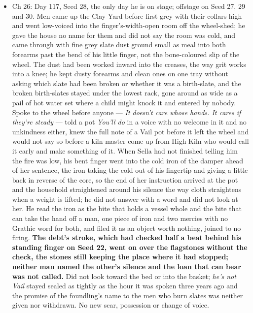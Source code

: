 \documentclass{design/chronicle}
\begin{document}
{\begin{itemize}[leftmargin=1.4em,itemsep=1pt,topsep=3pt,parsep=0pt]
\item Ch 26: Day 117, Seed 28, the only day he is on stage; offstage on Seed 27, 29 and 30. Men came up the Clay Yard before first grey with their collars high and went low-voiced into the finger’s-width-open room off the wheel-shed; he gave the house no name for them and did not say the room was cold, and came through with fine grey slate dust ground small as meal into both forearms past the bend of his little finger, not the bone-coloured slip of the wheel. The dust had been worked inward into the creases, the way grit works into a knee; he kept dusty forearms and clean ones on one tray without asking which slate had been broken or whether it was a birth-slate, and the broken birth-slates stayed under the lowest rack, gone around as wide as a pail of hot water set where a child might knock it and entered by nobody. Spoke to the wheel before anyone — \emph{It doesn’t care whose hands. It cares if they’re steady} — told a pot \emph{You’ll do} in a voice with no welcome in it and no unkindness either, knew the full note of a Vail pot before it left the wheel and would not say so before a kiln-master come up from High Kiln who would call it early and make something of it. When Sella had not finished telling him the fire was low, his bent finger went into the cold iron of the damper ahead of her sentence, the iron taking the cold out of his fingertip and giving a little back in reverse of the core, so the end of her instruction arrived at the pot and the household straightened around his silence the way cloth straightens when a weight is lifted; he did not answer with a word and did not look at her. He read the iron as the bite that holds a vessel whole and the bite that can take the hand off a man, one piece of iron and two mercies with no Grathic word for both, and filed it as an object worth nothing, joined to no firing. \textbf{The debt’s stroke, which had checked half a beat behind his standing finger on Seed 22, went on over the flagstones without the check, the stones still keeping the place where it had stopped; neither man named the other’s silence and the loan that can hear was not called.} Did not look toward the bed or into the basket; \emph{he’s not Vail} stayed sealed as tightly as the hour it was spoken three years ago and the promise of the foundling’s name to the men who burn slates was neither given nor withdrawn. No new scar, possession or change of voice.

\end{itemize}

\begin{itemize}[leftmargin=1.4em,itemsep=1pt,topsep=3pt,parsep=0pt]


\end{itemize}}
\end{document}
